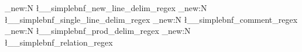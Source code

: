 \regex_new:N \l__simplebnf_new_line_delim_regex
\regex_new:N \l__simplebnf_single_line_delim_regex
\regex_new:N \l__simplebnf_comment_regex
\regex_new:N \l__simplebnf_prod_delim_regex
\regex_new:N \l__simplebnf_relation_regex
